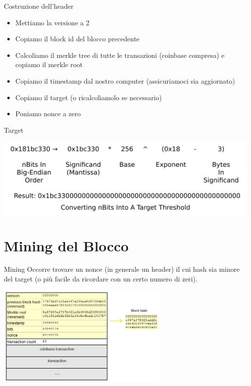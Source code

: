 \documentclass[aspectratio=169]{beamer}
\begin{document}
\begin{frame}{Costruzione dell'header}
    \begin{itemize}
        \item Mettiamo la versione a 2
        \item Copiamo il block id del blocco precedente
        \item Calcoliamo il merkle tree di tutte le transazioni (coinbase compresa) e copiamo il merkle root
        \item Copiamo il timestamp dal nostro computer (assicuriamoci sia aggiornato)
        \item Copiamo il target (o ricalcoliamolo se necessario)
        \item Poniamo nonce a zero
    \end{itemize}
\end{frame}

\begin{frame}{Target}
    \begin{center}
        \includegraphics[height=4cm]{target.png}
    \end{center}
\end{frame}

\section{Mining del Blocco}

\begin{frame}{Mining}
    Occorre trovare un nonce (in generale un header) il cui hash sia minore del target (o più facile da ricordare con un certo numero di zeri).
    \begin{center}
        \includegraphics[height=5cm]{blocco_struct.png}
    \end{center}
\end{frame}
\end{document}
